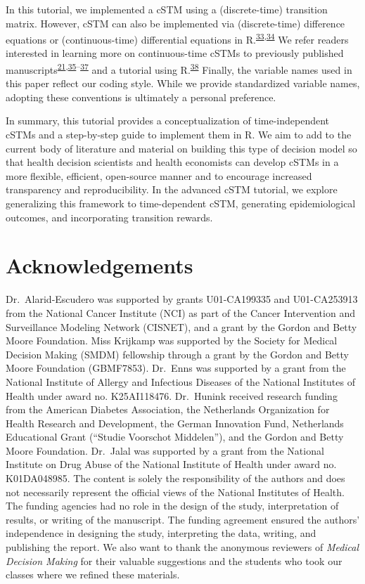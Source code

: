 \documentclass[
]{article}
\begin{document}
In this tutorial, we implemented a cSTM using a (discrete-time) transition matrix. However, cSTM can also be implemented via (discrete-time) difference equations or (continuous-time) differential equations in R.\textsuperscript{\protect\hyperlink{ref-Grimmett2014}{33},\protect\hyperlink{ref-Axler2005}{34}} We refer readers interested in learning more on continuous-time cSTMs to previously published manuscripts\textsuperscript{\protect\hyperlink{ref-VanRosmalen2013}{21},\protect\hyperlink{ref-Cao2016}{35}--\protect\hyperlink{ref-Soares2012}{37}} and a tutorial using R.\textsuperscript{\protect\hyperlink{ref-Frederix2013a}{38}} Finally, the variable names used in this paper reflect our coding style. While we provide standardized variable names, adopting these conventions is ultimately a personal preference.

In summary, this tutorial provides a conceptualization of time-independent cSTMs and a step-by-step guide to implement them in R. We aim to add to the current body of literature and material on building this type of decision model so that health decision scientists and health economists can develop cSTMs in a more flexible, efficient, open-source manner and to encourage increased transparency and reproducibility. In the advanced cSTM tutorial, we explore generalizing this framework to time-dependent cSTM, generating epidemiological outcomes, and incorporating transition rewards.

\hypertarget{acknowledgements}{%
\section{Acknowledgements}\label{acknowledgements}}

Dr.~Alarid-Escudero was supported by grants U01-CA199335 and U01-CA253913 from the National Cancer Institute (NCI) as part of the Cancer Intervention and Surveillance Modeling Network (CISNET), and a grant by the Gordon and Betty Moore Foundation. Miss Krijkamp was supported by the Society for Medical Decision Making (SMDM) fellowship through a grant by the Gordon and Betty Moore Foundation (GBMF7853). Dr.~Enns was supported by a grant from the National Institute of Allergy and Infectious Diseases of the National Institutes of Health under award no. K25AI118476. Dr.~Hunink received research funding from the American Diabetes Association, the Netherlands Organization for Health Research and Development, the German Innovation Fund, Netherlands Educational Grant (``Studie Voorschot Middelen''), and the Gordon and Betty Moore Foundation. Dr.~Jalal was supported by a grant from the National Institute on Drug Abuse of the National Institute of Health under award no. K01DA048985. The content is solely the responsibility of the authors and does not necessarily represent the official views of the National Institutes of Health. The funding agencies had no role in the design of the study, interpretation of results, or writing of the manuscript. The funding agreement ensured the authors' independence in designing the study, interpreting the data, writing, and publishing the report. We also want to thank the anonymous reviewers of \emph{Medical Decision Making} for their valuable suggestions and the students who took our classes where we refined these materials.
\end{document}
